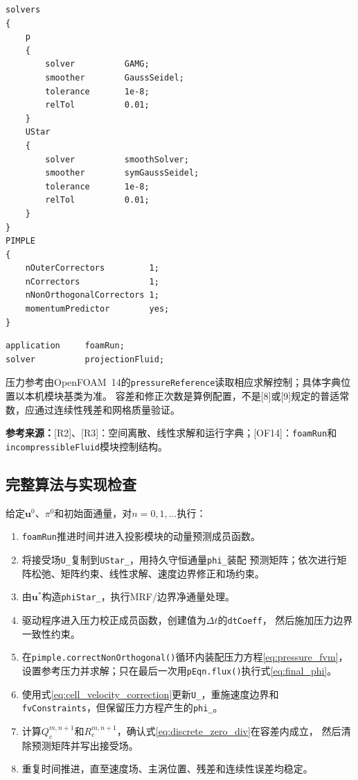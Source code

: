 \documentclass[UTF8,12pt,a4paper]{ctexart}
\numberwithin{equation}{section}
\newcommand{\dt}{\Delta t}
\newcommand{\Chorin}{\textnormal{[8]}}
\newcommand{\Guermond}{\textnormal{[9]}}
\newcommand{\Rtwo}{\textnormal{[R2]}}
\newcommand{\Rthree}{\textnormal{[R3]}}
\newcommand{\OFfourteen}{\textnormal{[OF14]}}
\newcommand{\source}[1]{\par\smallskip\noindent\colorbox{sourcebg}{%
  \parbox{0.955\linewidth}{\footnotesize\color{sourcegray}\textbf{参考来源：}#1}}\par\smallskip}
\begin{document}
\begin{lstlisting}[style=foam]
solvers
{
    p
    {
        solver          GAMG;
        smoother        GaussSeidel;
        tolerance       1e-8;
        relTol          0.01;
    }
    UStar
    {
        solver          smoothSolver;
        smoother        symGaussSeidel;
        tolerance       1e-8;
        relTol          0.01;
    }
}
PIMPLE
{
    nOuterCorrectors         1;
    nCorrectors              1;
    nNonOrthogonalCorrectors 1;
    momentumPredictor        yes;
}
\end{lstlisting}
\begin{lstlisting}[style=foam]
application     foamRun;
solver          projectionFluid;
\end{lstlisting}
压力参考由OpenFOAM~14的\texttt{pressureReference}读取相应求解控制；具体字典位置以本机模块基类为准。
容差和修正次数是算例配置，不是\Chorin 或\Guermond 规定的普适常数，应通过连续性残差和网格质量验证。
\source{\Rtwo、\Rthree：空间离散、线性求解和运行字典；\OFfourteen：\texttt{foamRun}和
\texttt{incompressibleFluid}模块控制结构。}

\subsection{完整算法与实现检查}
给定$\bm u^0$、$\pi^0$和初始面通量，对$n=0,1,\ldots$执行：
\begin{enumerate}
  \item \texttt{foamRun}推进时间并进入投影模块的动量预测成员函数。
  \item 将接受场\texttt{U\_}复制到\texttt{UStar\_}，用持久守恒通量\texttt{phi\_}装配
  预测矩阵；依次进行矩阵松弛、矩阵约束、线性求解、速度边界修正和场约束。
  \item 由$\bm u^*$构造\texttt{phiStar\_}，执行MRF/边界净通量处理。
  \item 驱动程序进入压力校正成员函数，创建值为$\dt$的\texttt{dtCoeff}，
  然后施加压力边界一致性约束。
  \item 在\texttt{pimple.correctNonOrthogonal()}循环内装配压力方程\eqref{eq:pressure_fvm}，
  设置参考压力并求解；只在最后一次用\texttt{pEqn.flux()}执行式\eqref{eq:final_phi}。
  \item 使用式\eqref{eq:cell_velocity_correction}更新\texttt{U\_}，重施速度边界和
  \texttt{fvConstraints}，但保留压力方程产生的\texttt{phi\_}。
  \item 计算$Q_c^{m,n+1}$和$R_c^{m,n+1}$，确认式\eqref{eq:discrete_zero_div}在容差内成立，
  然后清除预测矩阵并写出接受场。
  \item 重复时间推进，直至速度场、主涡位置、残差和连续性误差均稳定。
\end{enumerate}
\end{document}
